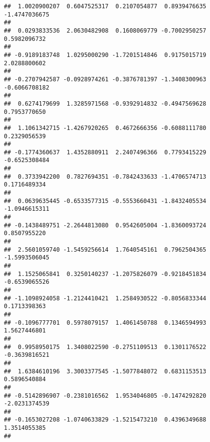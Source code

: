 \documentclass[]{article}
\begin{document}
\begin{verbatim}
##  1.0020900207  0.6047525317  0.2107054877  0.8939476635 -1.4747036675 
##                                                                       
##  0.0293833536  2.0630482908  0.1608069779 -0.7002950257  0.5982096732 
##                                                                       
## -0.9189183748  1.0295000290 -1.7201514846  0.9175015719  2.0288800602 
##                                                                       
## -0.2707942587 -0.0928974261 -0.3876781397 -1.3408300963 -0.6066708182 
##                                                                       
##  0.6274179699  1.3285971568 -0.9392914832 -0.4947569628  0.7953770650 
##                                                                       
##  1.1061342715 -1.4267920265  0.4672666356 -0.6088111780  0.2329056539 
##                                                                       
## -0.1774360637  1.4352880911  2.2407496366  0.7793415229 -0.6525308484 
##                                                                       
##  0.3733942200  0.7827694351 -0.7842433633 -1.4706574713  0.1716489334 
##                                                                       
##  0.0639635445 -0.6533577315 -0.5553660431 -1.8432405534 -1.0946615311 
##                                                                       
## -0.1438489751 -2.2644813080  0.9542605004 -1.8360093724  0.8507955220 
##                                                                       
##  2.5601059740 -1.5459256614  1.7640545161  0.7962504365 -1.5993506045 
##                                                                       
##  1.1525065841  0.3250140237 -1.2075826079 -0.9218451834 -0.6539065526 
##                                                                       
## -1.1098924058 -1.2124410421  1.2584930522 -0.8056833344  0.1713398363 
##                                                                       
## -0.1096777701  0.5978079157  1.4061450788  0.1346594993  1.5627446801 
##                                                                       
##  0.9958950175  1.3408022590 -0.2751109513  0.1301176522 -0.3639816521 
##                                                                       
##  1.6384610196  3.3003377545 -1.5077848072  0.6831153513  0.5896540884 
##                                                                       
## -0.5142896907 -0.2381016562  1.9534046805 -0.1474292820 -2.0231374539 
##                                                                       
## -0.1653027208 -1.0740633829 -1.5215473210  0.4396349688  1.3514055385 
##                                                                       

\end{verbatim}
\end{document}
